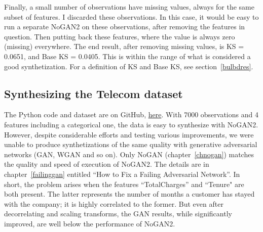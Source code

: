 \documentclass[oneside,10pt]{book}
\begin{document}
Finally, a small number of observations have missing values, always for the same subset of features. I discarded these observations. In this case,
 it would be easy to run a separate NoGAN2 on these observations, after removing the features in question. Then putting back these features,
 where the value is always zero (missing) everywhere. The end result, after removing missing values, is  KS = 0.0651, and
 Base KS = 0.0405. This is within the range of what is considered a good synthetization. For a definition of KS and Base KS, see
 section~\ref{bulbdres}.













\subsection{Synthesizing the Telecom dataset}\label{opbg30}

The Python code and dataset are on GitHub, \href{https://github.com/VincentGranville/Main/blob/main/DeepResampling_telecom.py}{here}.
With 7000 observations and 4 features including a categorical one, the data is easy to synthesize with NoGAN2. However,
 despite considerable efforts and testing various improvements, we were unable to produce synthetizations of the same quality with
 generative adversarial networks (GAN, WGAN and so on).
 Only NoGAN (chapter~\ref{chnogan}) matches the quality and speed of execution of NoGAN2. The details are in chapter~\ref{failinggan} entitled ``How to Fix a
 Failing Adversarial Network''. In short, the problem arises when the  features ``TotalCharges'' and ``Tenure" are
 both present.
 The latter represents the number of months
 a customer has stayed with the company; it is highly correlated to the former. But even after decorrelating and scaling transforms, the GAN results, while significantly improved,
 are well below the performance of NoGAN2.
\end{document}
